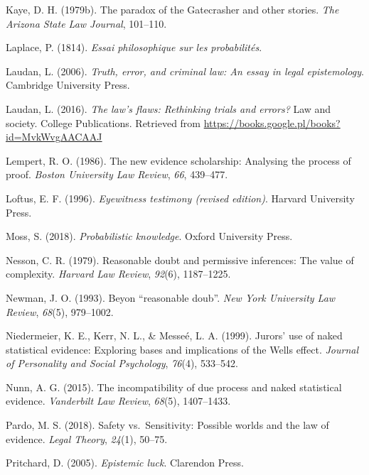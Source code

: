 \documentclass[10pt,dvipsnames,enabledeprecatedfontcommands]{scrartcl}
\begin{document}
\leavevmode\hypertarget{ref-Kaye79gate}{}%
Kaye, D. H. (1979b). The paradox of the Gatecrasher and other stories.
\emph{The Arizona State Law Journal}, 101--110.

\leavevmode\hypertarget{ref-Laplace1814}{}%
Laplace, P. (1814). \emph{Essai philosophique sur les probabilités}.

\leavevmode\hypertarget{ref-laudan2006truth}{}%
Laudan, L. (2006). \emph{Truth, error, and criminal law: An essay in
legal epistemology}. Cambridge University Press.

\leavevmode\hypertarget{ref-laudan2016law}{}%
Laudan, L. (2016). \emph{The law's flaws: Rethinking trials and errors?}
Law and society. College Publications. Retrieved from
\url{https://books.google.pl/books?id=MvkWvgAACAAJ}

\leavevmode\hypertarget{ref-Lempert1986}{}%
Lempert, R. O. (1986). The new evidence scholarship: Analysing the
process of proof. \emph{Boston University Law Review}, \emph{66},
439--477.

\leavevmode\hypertarget{ref-Loftus1996}{}%
Loftus, E. F. (1996). \emph{Eyewitness testimony (revised edition)}.
Harvard University Press.

\leavevmode\hypertarget{ref-moss2018}{}%
Moss, S. (2018). \emph{Probabilistic knowledge}. Oxford University
Press.

\leavevmode\hypertarget{ref-Nesson1979Reasonable-doub}{}%
Nesson, C. R. (1979). Reasonable doubt and permissive inferences: The
value of complexity. \emph{Harvard Law Review}, \emph{92}(6),
1187--1225.

\leavevmode\hypertarget{ref-newman1993}{}%
Newman, J. O. (1993). Beyon ``reasonable doub''. \emph{New York
University Law Review}, \emph{68}(5), 979--1002.

\leavevmode\hypertarget{ref-niedermeierEtAl1999}{}%
Niedermeier, K. E., Kerr, N. L., \& Messeé, L. A. (1999). Jurors' use of
naked statistical evidence: Exploring bases and implications of the
Wells effect. \emph{Journal of Personality and Social Psychology},
\emph{76}(4), 533--542.

\leavevmode\hypertarget{ref-nunn2015}{}%
Nunn, A. G. (2015). The incompatibility of due process and naked
statistical evidence. \emph{Vanderbilt Law Review}, \emph{68}(5),
1407--1433.

\leavevmode\hypertarget{ref-pardo2018}{}%
Pardo, M. S. (2018). Safety vs.~Sensitivity: Possible worlds and the law
of evidence. \emph{Legal Theory}, \emph{24}(1), 50--75.

\leavevmode\hypertarget{ref-pritchard2005epistemic}{}%
Pritchard, D. (2005). \emph{Epistemic luck}. Clarendon Press.
\end{document}
